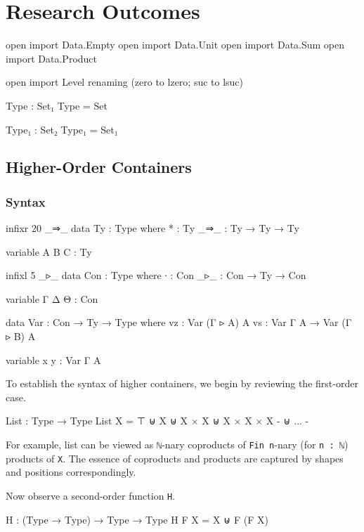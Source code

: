 \chapter{Research Outcomes}

\begin{code}[hide]
open import Data.Empty
open import Data.Unit
open import Data.Sum
open import Data.Product

open import Level renaming (zero to lzero; suc to lsuc)

Type : Set₁
Type = Set

Type₁ : Set₂
Type₁ = Set₁
\end{code}

\section{Higher-Order Containers}

\subsection{Syntax}

\begin{code}[hide]
infixr 20 _⇒_
data Ty : Type where
  * : Ty
  _⇒_ : Ty → Ty → Ty

variable A B C : Ty

infixl 5 _▹_
data Con : Type where
  ∙   : Con
  _▹_ : Con → Ty → Con

variable Γ Δ Θ : Con

data Var : Con → Ty → Type where
  vz : Var (Γ ▹ A) A
  vs : Var Γ A → Var (Γ ▹ B) A

variable x y : Var Γ A
\end{code}

To establish the syntax of higher containers, we begin by reviewing the first-order case. 

\begin{code}
List : Type → Type
List X = ⊤ ⊎ X ⊎ X × X ⊎ X × X × X {- ⊎ ... -}
\end{code}

For example, list can be viewed as \texttt{ℕ}-nary coproducts of \texttt{Fin n}-nary (for \texttt{n : ℕ}) products of \texttt{X}. The essence of coproducts and products are captured by shapes and positions correspondingly.

Now observe a second-order function \texttt{H}.

\begin{code}
H : (Type → Type) → Type → Type
H F X = X ⊎ F (F X)
\end{code}

